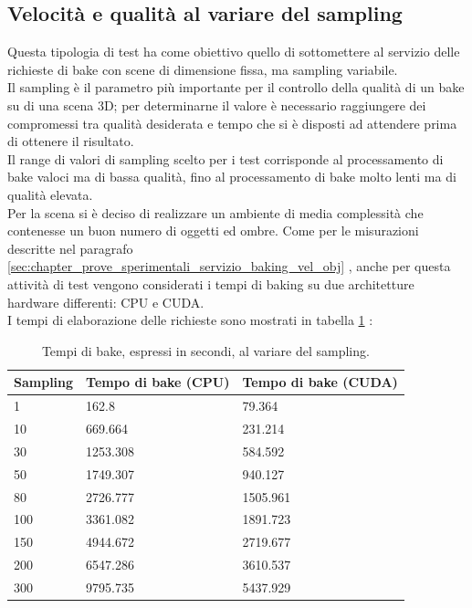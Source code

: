 \subsection{Velocità e qualità al variare del sampling}
\label{sec:chapter_prove_sperimentali_servizio_baking_vel_sam}

Questa tipologia di test ha come obiettivo quello di sottomettere al servizio delle richieste di bake con scene di dimensione fissa, ma sampling variabile. 
\\
Il sampling è il parametro più importante per il controllo della qualità di un bake su di una scena 3D; per determinarne il valore è necessario raggiungere dei compromessi tra qualità desiderata e tempo che si è disposti ad attendere prima di ottenere il risultato. 
\\
Il range di valori di sampling scelto per i test corrisponde al processamento di  bake valoci ma di bassa qualità, fino al processamento di bake molto lenti ma di qualità elevata.
\\
Per la scena si è deciso di realizzare un ambiente di media complessità che contenesse un buon numero di oggetti ed ombre. Come per le misurazioni descritte nel paragrafo \ref{sec:chapter_prove_sperimentali_servizio_baking_vel_obj} , anche per questa attività di test vengono considerati i tempi di baking su due architetture hardware differenti: CPU e CUDA.
\\
I tempi di elaborazione delle richieste sono mostrati in tabella \ref{table:per_samp} :
\newpage
\begin{table}[]
\centering
\caption[Performance al variare del sampling]{Tempi di bake, espressi in secondi, al variare del sampling.}
\begin{tabular}{|l|l|l|}
\hline
\textbf{Sampling} & \textbf{Tempo di bake (CPU)} & \textbf{Tempo di bake (CUDA)} \\ \hline
1 & 162.8 & 79.364 \\ \hline
10 & 669.664 & 231.214 \\ \hline
30 & 1253.308 & 584.592 \\ \hline
50 & 1749.307 & 940.127 \\ \hline
80 & 2726.777 & 1505.961 \\ \hline
100 & 3361.082 & 1891.723 \\ \hline
150 & 4944.672 & 2719.677 \\ \hline
200 & 6547.286 & 3610.537 \\ \hline
300 & 9795.735 & 5437.929 \\ \hline
\end{tabular}
\label{table:per_samp}
\end{table}
